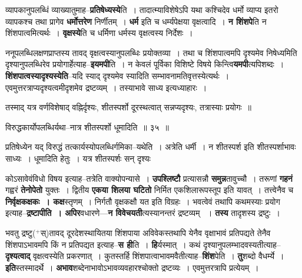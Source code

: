 \documentclass[article,12pt,a4paper]{memoir}
\newcommand{\add}[1]{($^{+}$#1)}
\begin{document}
	  \endgroup
	

	  \pstart व्यापकानुपलब्धिं व्याख्यातुमाह--\textbf{प्रतिषेध्यस्ये}ति । तादात्म्याविशेषेऽपि यथा कश्चिदेव धर्मो व्याप्य इतरो व्यापकश्च तथा प्रागेव \textbf{धर्मोत्तरेण} निर्णीतम् । \textbf{धर्म} इति च धर्म्यपेक्षया वृक्षत्वादि । \textbf{न शिंशपे}ति न शिंशपात्वमित्यर्थः । \textbf{वृक्षस्ये}ति च धर्मिणा धर्मस्य वृक्षत्वस्य निर्देशः ।
	\pend
      

	  \pstart ननूपलब्धिलक्षणप्राप्तस्य तावद् वृक्षत्वस्यानुपलब्धिः प्रयोक्तव्या । तथा च शिंशपात्वमपि दृश्यमेव निषेध्यमिति दृश्यानुपलब्धिरेव प्रयोगार्हेत्याह--\textbf{इयमपी}ति । न केवलं पूर्विका विशिष्टे विषये किन्त्वि\textbf{यमपी}त्यपिशब्दः । \textbf{शिंशपात्वस्यादृश्यस्येति}--यदि स्याद् दृश्यमेव स्यादिति सम्भावनामतिवृत्तस्येत्यर्थः । एवमुत्तरत्राप्यदृश्यत्वमीदृशमेव द्रष्टव्यम् । तस्याभावे साध्य इत्यध्याहारः ।
	\pend
	  \bigskip
	  \begingroup
	

	  \pstart तस्माद् यत्र वर्णविशेषाद् वह्निर्दृश्यः, शीतस्पर्शो दूरस्थत्वात् सन्नप्यदृश्यः, तत्रास्याः प्रयोगः ॥
	\pend
        
	  \bigskip
	  \begingroup
	

	  \pstart विरुद्धकार्योपलब्धिर्यथा--नात्र शीतस्पर्शो धूमादिति ॥ ३५ ॥
	\pend
      
	  \endgroup
	 

	  \pstart प्रतिषेध्येन यद् विरुद्धं तत्कार्यस्योपलब्धिर्गमिका--यथेति । अत्रेति धर्मी । न शीतस्पर्श इति शीतस्पर्शाभावः साध्यः । धूमादिति हेतुः । यत्र शीतस्पर्शः सन् दृश्यः
	\pend
      
	  \endgroup
	

	  \pstart कोऽसावेवंविधो विषय इत्याह--तत्रेति वाक्योपन्यासे । \textbf{उपश्लिष्टौ} प्रत्यासन्नौ \textbf{समुन्न}तावुच्चौ । तरूणां \textbf{गहनं} गह्वरं \textbf{तेनोपेतो} युक्तः । द्वितीय \textbf{एकया शिलया घटितो} निर्मित एकशिलारूपस्तूप इति यावत् । तत्त्वेनैव च \textbf{निर्वृक्षकक्षकः । कक्ष}स्तृणम् । निर्गतौ वृक्षकक्षौ यत इति विग्रहः । भवत्वेवं तथापि कथमस्याः प्रयोग इत्याह--\textbf{द्रष्टापीति । अपिर}वधारणे—\textbf{न विवेचयती}त्यस्यानन्तरं द्रष्टव्यम्  । \textbf{तस्य} तादृशस्य द्रष्टुः ।
	\pend
      

	  \pstart भवतु द्रष्टु\add{स्}तावद् दूरदेशस्थायितया शिंशपाया अविवेकस्तथापि येनैव वृक्षाभावं प्रतिपद्यते तेनैव शिंशपाऽभावमपि किं न प्रतिपद्यत इत्याह--\textbf{स ही}ति । \textbf{हि}र्यस्मात् । कथं दृश्यानुपलम्भादवस्यतीत्याह--\textbf{दृश्यत्वाद्} वृक्षत्वस्येति प्रकरणात् । कुतस्तर्हि शिंशपा\leavevmode{}त्वाभावमवैतीत्याह--\textbf{शिंश}पेति । \textbf{तु}शब्दो वैधर्म्ये । \textbf{इति}स्तस्मादर्थे । \textbf{अभाव}शब्देनाभावोऽभावव्यवहारश्चोक्तो द्रष्टव्यः । एवमुत्तरत्रापि प्रत्येयम् ।
	\pend
      
\end{document}
